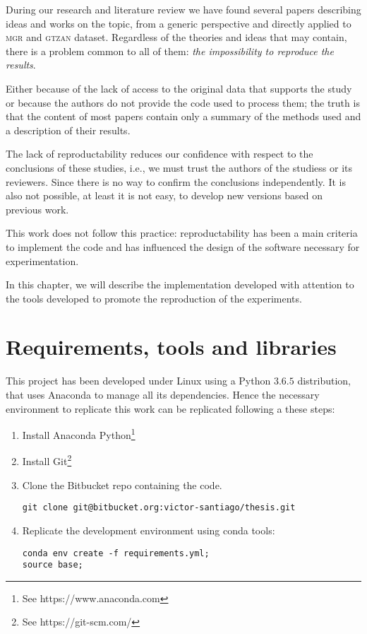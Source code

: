 \label{chap:imple}

During our research and literature review we have found several papers describing ideas and works on the topic, from a generic perspective and directly applied to \textsc{\textsc{\textsc{mgr}}} and \textsc{gtzan} dataset. Regardless of the theories and ideas that may contain, there is a problem common to all of them: {\it the impossibility to reproduce the results}.


Either because of the lack of access to the original data that supports the study or because the authors do not provide the code used to process them; the truth is that the content of most papers contain only a summary of the methods used and a description of their results.


The lack of reproductability reduces our confidence with respect to the conclusions of these studies, i.e., we must trust the authors of the studiess or its reviewers. Since there is no way to confirm the conclusions independently. It is also not possible, at least it is not easy, to develop new versions based on previous work.


This work does not follow this practice: reproductability has been a main criteria to implement the code and has influenced the design of the software necessary for experimentation.

In this chapter, we will describe the implementation developed with attention to the tools developed to promote the reproduction of the experiments.

\section{Requirements, tools and libraries}

This project has been developed under Linux using a Python $3.6.5$ distribution, that uses Anaconda to manage all its dependencies. Hence the necessary environment to replicate this work can be replicated following a these steps:

\begin{enumerate}
  \item {
    Install Anaconda Python\footnote{See https://www.anaconda.com}
  }
  \item {
    Install Git\footnote{See https://git-scm.com/}
  }
  \item {
    Clone the Bitbucket repo containing the code.

    \texttt{git clone git@bitbucket.org:victor-santiago/thesis.git}
  }
  \item {
    Replicate the development environment using conda tools:

    \begin{verbatim}
conda env create -f requirements.yml;
source base;
    \end{verbatim}
  }
\end{enumerate}

